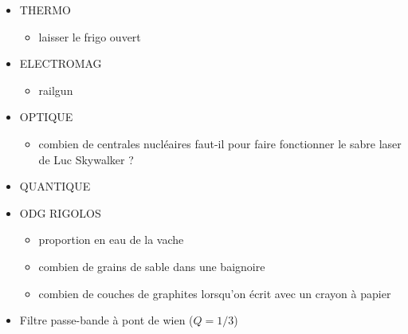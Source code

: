 \begin{itemize}
\begin{itemize}
    \end{itemize}
    \item THERMO
    \begin{itemize}
        \item laisser le frigo ouvert
    \end{itemize}
    \item ELECTROMAG
    \begin{itemize}
        \item railgun
    \end{itemize}
    \item OPTIQUE
    \begin{itemize}
        \item combien de centrales nucléaires faut-il pour faire fonctionner le sabre laser de Luc Skywalker ?
    \end{itemize}
    \item QUANTIQUE
    \item ODG RIGOLOS
    \begin{itemize}
        \item proportion en eau de la vache
        \item combien de grains de sable dans une baignoire
        \item combien de couches de graphites lorsqu'on écrit avec un crayon à papier
    \end{itemize}
    
    \item Filtre passe-bande à pont de wien ($Q = 1/3$)
\end{itemize}

\nocite{*}
\printbibliography